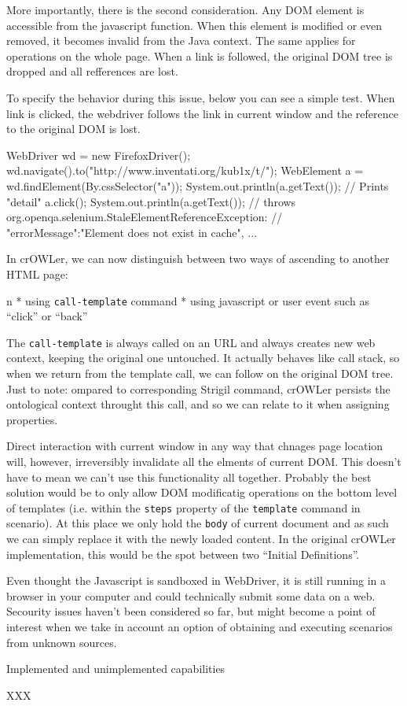 More importantly, there is the second consideration. Any DOM element is
accessible from the javascript function. When this element is modified or even
removed, it becomes invalid from the Java context. The same applies for
operations on the whole page. When a link is followed, the original DOM tree 
is dropped and all refferences are lost. 

To specify the behavior during this issue, below you can see a simple test.
When link is clicked, the webdriver follows the link in current window and the
reference to the original DOM is lost. 

\begtt
WebDriver wd = new FirefoxDriver();
wd.navigate().to("http://www.inventati.org/kub1x/t/");
WebElement a = wd.findElement(By.cssSelector("a"));
System.out.println(a.getText()); // Prints "detail"
a.click();
System.out.println(a.getText());
// throws org.openqa.selenium.StaleElementReferenceException:
// { "errorMessage":"Element does not exist in cache", ... }
\endtt

In crOWLer, we can now distinguish between two ways of ascending to another HTML page: 

\begitems \style n
  * using {\tt call-template} command
  * using javascript or user event such as ``click'' or ``back''
\enditems

The {\tt call-template} is always called on an URL and always creates new web
context, keeping the original one untouched. It actually behaves like call
stack, so when we return from the template call, we can follow on the original
DOM tree. Just to note: ompared to corresponding Strigil command, crOWLer
persists the ontological context throught this call, and so we can relate to it
when assigning properties. 

Direct interaction with current window in any way that chnages page location
will, however, irreversibly invalidate all the elments of current DOM. This
doesn't have to mean we can't use this functionality all together. Probably the
best solution would be to only allow DOM modificatig operations on the bottom
level of templates (i.e. within the {\tt steps} property of the {\tt template}
command in scenario). At this place we only hold the {\tt body} of current
document and as such we can simply replace it with the newly loaded content. 
In the original crOWLer implementation, this would be the spot between two
``Initial Definitions''. 

Even thought the Javascript is sandboxed in WebDriver, it is still running in a
browser in your computer and could technically submit some data on a web.
Secourity issues haven't been considered so far, but might become a point of
interest when we take in account an option of obtaining and executing scenarios
from unknown sources. 


\secc Implemented and unimplemented capabilities

XXX

